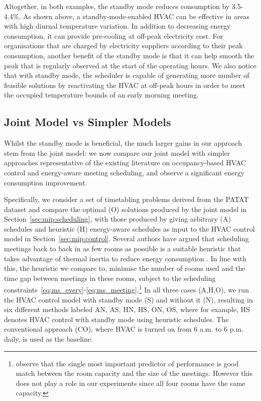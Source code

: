Altogether, in both examples, the standby mode reduces consumption by 3.5-4.4\%. %
As shown above, a standby-mode-enabled HVAC can be effective in areas with high diurnal temperature variation.  In addition to decreasing energy consumption, it can provide pre-cooling at off-peak electricity cost. For organisations that are charged by electricity suppliers according to their peak consumption, another benefit of the standby mode is that it can help smooth the peak that is regularly observed at the start of the operating hours. We also notice that with standby mode, the scheduler is capable of generating more number of feasible solutions by reactivating the HVAC at off-peak hours in order to meet the occupied temperature bounds of an early morning meeting.


\subsection{Joint Model vs Simpler Models}
\label{subsec:experiments:integration}

Whilst the standby mode is beneficial, the much larger gains in our approach stem from the joint model: we now compare our joint model with simpler approaches representative of the existing literature on occupancy-based HVAC control and energy-aware meeting scheduling, and observe a significant energy consumption improvement.

Specifically, we consider a set of timetabling problems derived from the PATAT \cite{patat02} dataset 
and compare the optimal (O) solutions produced by the joint model in Section~\ref{sec:mip:scheduling}, with those produced by giving arbitrary (A) schedules and heuristic (H) energy-aware schedules as input to the HVAC control model in Section~\ref{sec:mip:control}. Several authors have argued that scheduling meetings back to back in as few rooms as possible is a suitable heuristic that takes advantage of thermal inertia to reduce energy consumption \citep{kwak2013tesla,majumdar2012energy,pan2012thermal}. In line with this, the heuristic we compare to, minimise the number of rooms used and the time gap between meetings in these rooms, subject to the scheduling constraints~\ref{eq:ms_every}-\ref{eq:ms_meeting}.\footnote{\cite{majumdar2012energy} observe that the single most important predictor of performance is good match between the room capacity and the size of the meetings. However this does not play a role in our experiments since all four rooms have the same capacity.} In all three cases (A,H,O), we run the HVAC control model with standby mode (S) and without it (N), resulting in six different methods labeled AN, AS, HN, HS, ON, OS, where for example, HS denotes HVAC control with standby mode using heuristic schedules. The conventional approach (CO), where HVAC is turned on from 6 a.m. to 6 p.m. daily, is used as the baseline.

